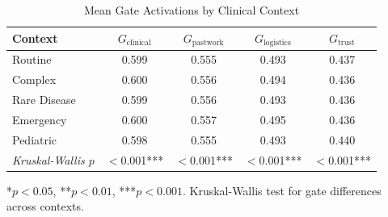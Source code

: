 \begin{table}[t]
\centering
\caption{Mean Gate Activations by Clinical Context}
\label{tab:gates}
\begin{tabular}{@{}lcccc@{}}
\toprule
\textbf{Context} & $G_{\text{clinical}}$ & $G_{\text{pastwork}}$ & $G_{\text{logistics}}$ & $G_{\text{trust}}$ \\
\midrule
Routine & 0.599 & 0.555 & 0.493 & 0.437 \\
Complex & 0.600 & 0.556 & 0.494 & 0.436 \\
Rare Disease & 0.599 & 0.556 & 0.493 & 0.436 \\
Emergency & 0.600 & 0.557 & 0.495 & 0.436 \\
Pediatric & 0.598 & 0.555 & 0.493 & 0.440 \\
\midrule
\textit{Kruskal-Wallis $p$} & $<$0.001*** & $<$0.001*** & $<$0.001*** & $<$0.001*** \\
\bottomrule
\end{tabular}
\vspace{2mm}
\footnotesize{*$p<0.05$, **$p<0.01$, ***$p<0.001$. Kruskal-Wallis test for gate differences across contexts.}
\end{table}